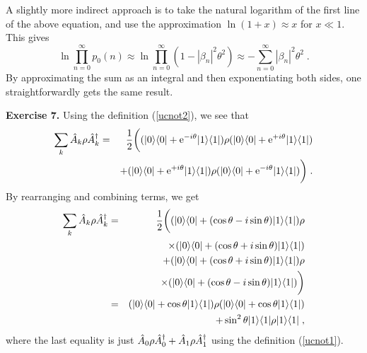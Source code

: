 A slightly more indirect approach is to take the natural logarithm
of the first line of the above equation, and use the approximation
$\ln(1+x) \approx x$ for $x \ll 1$.  This gives
\[
\ln \prod_{n=0}^\infty p_0(n)
  \approx \ln \prod_{n=0}^\infty (1-|\beta_n|^2\theta^2)
  \approx - \sum_{n=0}^\infty |\beta_n|^2\theta^2 \;.
\]
By approximating the sum as an integral and then exponentiating both
sides, one straightforwardly gets the same result.

{\bf Exercise 7.}  Using the definition (\ref{ucnot2}), we see that
\begin{eqnarray}
\sum_k {\hat A}_k \rho {\hat A^\dagger}_k &=&
  {1\over2}\biggl( ({| 0 \rangle}{\langle 0 |} + {\rm e}^{-i\theta}{| 1 \rangle}{\langle 1 |} )
  \rho ({| 0 \rangle}{\langle 0 |} + {\rm e}^{+i\theta}{| 1 \rangle}{\langle 1 |} ) \nonumber\\
&& + ({| 0 \rangle}{\langle 0 |} + {\rm e}^{+i\theta}{| 1 \rangle}{\langle 1 |} )\rho
  ({| 0 \rangle}{\langle 0 |} + {\rm e}^{-i\theta}{| 1 \rangle}{\langle 1 |}) \biggr) \;. \nonumber
\end{eqnarray}
By rearranging and combining terms, we get
\begin{eqnarray}
\sum_k {\hat A}_k \rho {\hat A^\dagger}_k &=&
  {1\over2}\biggl( ({| 0 \rangle}{\langle 0 |} + (\cos\theta-i\sin\theta){| 1 \rangle}{\langle 1 |} )
  \rho \nonumber\\
&& \times ({| 0 \rangle}{\langle 0 |} + (\cos\theta+i\sin\theta){| 1 \rangle}{\langle 1 |} ) \nonumber\\
&& + ({| 0 \rangle}{\langle 0 |} + (\cos\theta+i\sin\theta){| 1 \rangle}{\langle 1 |} )\rho \nonumber\\
&& \times ({| 0 \rangle}{\langle 0 |} + (\cos\theta-i\sin\theta){| 1 \rangle}{\langle 1 |}) \biggr) \nonumber\\
&=&   ({| 0 \rangle}{\langle 0 |} + \cos\theta{| 1 \rangle}{\langle 1 |})
  \rho ({| 0 \rangle}{\langle 0 |} + \cos\theta{| 1 \rangle}{\langle 1 |}) \nonumber\\
&& + \sin^2\theta {| 1 \rangle}{\langle 1 |} \rho {| 1 \rangle}{\langle 1 |} \;, \nonumber
\end{eqnarray}
where the last equality is just ${\hat A}_0\rho{\hat A^\dagger}_0 + {\hat A}_1\rho{\hat A^\dagger}_1$ using
the definition (\ref{ucnot1}).

